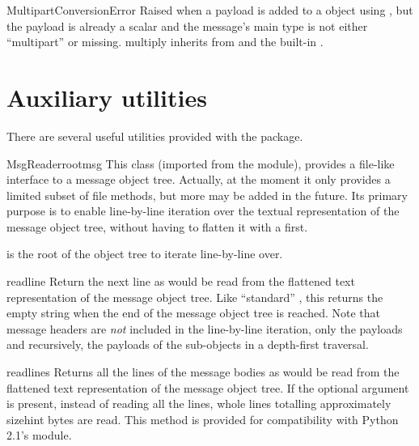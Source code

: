 \documentclass{howto}
\begin{document}
\begin{excclassdesc}{MultipartConversionError}{}
Raised when a payload is added to a  object using
, but the payload is already a scalar and the
message's  main type is not either ``multipart''
or missing.   multiply inherits
from  and the built-in .
\end{excclassdesc}

\section{Auxiliary utilities}
There are several useful utilities provided with the 
package.

\begin{classdesc}{MsgReader}{rootmsg}
This class (imported from the  module),
provides a file-like interface to a message object tree.  Actually, at
the moment it only provides a limited subset of file methods, but more
may be added in the future.  Its primary purpose is to enable
line-by-line iteration over the textual representation of the message
object tree, without having to flatten it with a 
first.

 is the root of the object tree to iterate line-by-line
over.

\begin{methoddesc}{readline}{}
Return the next line as would be read from the flattened text
representation of the message object tree.  Like ``standard''
, this returns the empty string when the end of the
message object tree is reached.  Note that message headers are
\emph{not} included in the line-by-line iteration, only the payloads
and recursively, the payloads of the sub-objects in a depth-first
traversal.
\end{methoddesc}

\begin{methoddesc}{readlines}{}
Returns all the lines of the message bodies as would be read from the
flattened text representation of the message object tree.  If the
optional  argument is present, instead of reading all
the lines, whole lines totalling approximately sizehint bytes are
read.  This method is provided for compatibility with Python 2.1's
 module.
\end{methoddesc}
\end{classdesc}
\end{document}
